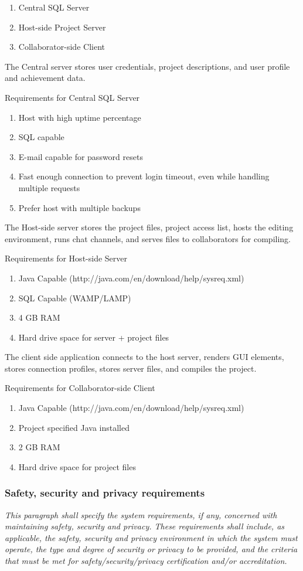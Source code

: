 \documentclass[twoside,letterpaper]{article}
\begin{document}
\begin{enumerate}
  \item Central SQL Server
  \item Host-side Project Server
  \item Collaborator-side Client
\end{enumerate}

The Central server stores user credentials, project descriptions, and user profile and achievement data.

Requirements for Central SQL Server
\begin{enumerate}
  \item Host with high uptime percentage
  \item SQL capable
  \item E-mail capable for password resets
  \item Fast enough connection to prevent login timeout, even while handling multiple requests
  \item Prefer host with multiple backups
\end{enumerate}

The Host-side server stores the project files, project access list, hosts the editing environment, runs chat channels, and serves files to collaborators for compiling.

Requirements for Host-side Server
\begin{enumerate}
  \item Java Capable (http://java.com/en/download/help/sysreq.xml)
  \item SQL Capable (WAMP/LAMP)
  \item 4 GB RAM
  \item Hard drive space for server + project files
\end{enumerate}

The client side application connects to the host server, renders GUI elements, stores connection profiles, stores server files, and compiles the project.

Requirements for Collaborator-side Client
\begin{enumerate}
  \item Java Capable (http://java.com/en/download/help/sysreq.xml)
  \item Project specified Java installed
  \item 2 GB RAM
  \item Hard drive space for project files
\end{enumerate}

\subsubsection[Safety, security and privacy requirements]{\rmfamily\bfseries
Safety, security and privacy requirements}
\hypertarget{RefHeading18659017292}{}{\itshape
This paragraph shall specify the system requirements, if any,
concerned with maintaining safety, security and privacy.
These requirements shall include, as applicable, the safety,
security and privacy environment in which the system must
operate, the type and degree of security or privacy to be
provided, and the criteria that must be met for
safety/security/privacy certification and/or accreditation.}
\end{document}
